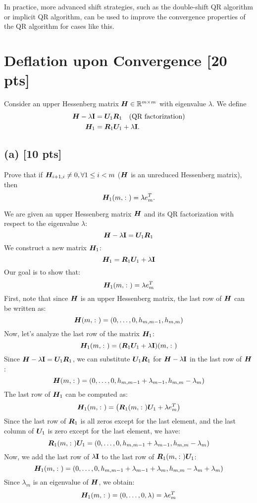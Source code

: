\documentclass[twoside,10pt]{article}
\begin{document}
In practice, more advanced shift strategies, such as the double-shift QR algorithm or implicit QR algorithm, can be used to improve the convergence properties of the QR algorithm for cases like this.

\section{Deflation upon Convergence [20 pts]}
Consider an upper Hessenberg matrix $\bm{H} \in \mathbb{R}^{m \times m}$ with eigenvalue $\lambda$. 
We define 
\begin{align}
  \bm{H} - \lambda \mathbf{I} &= \bm{U}_1 \bm{R}_1 \quad \text{(QR factorization)} \\ 
  \bm{H}_1 &= \bm{R}_1 \bm{U}_1 + \lambda \mathbf{I}.
\end{align}

\subsection*{(a) [10 pts]}
Prove that if $\bm{H}_{i + 1, i} \neq  0, \forall 1 \leq i < m$ ($\bm{H}$ is an unreduced Hessenberg matrix), then 
\begin{equation}
  \mtx{H}_1\left(m, \colon\right) = \lambda e_m^{T}. 
\end{equation}


\quad We are given an upper Hessenberg matrix $\bm{H}$ and its QR factorization with respect to the eigenvalue $\lambda$:
$$\bm{H} - \lambda \mathbf{I} = \bm{U}_1 \bm{R}_1$$
We construct a new matrix $\bm{H}_1$:
$$\bm{H}_1 = \bm{R}_1 \bm{U}_1 + \lambda \mathbf{I}$$
Our goal is to show that:
$$\mtx{H}_1\left(m, \colon\right) = \lambda e_m^{T}$$
First, note that since $\bm{H}$ is an upper Hessenberg matrix, the last row of $\bm{H}$ can be written as:
$$\mtx{H}\left(m, \colon\right) = \left(0, \dots, 0, h_{m,m-1}, h_{m,m}\right)$$
Now, let's analyze the last row of the matrix $\bm{H}_1$:
$$\mtx{H}_1\left(m, \colon\right) = \left(\mtx{R}_1 \mtx{U}_1 + \lambda \Id\right)\left(m, \colon\right)$$
Since $\bm{H} - \lambda \mathbf{I} = \bm{U}_1 \bm{R}_1$, we can substitute $\bm{U}_1 \bm{R}_1$ for $\bm{H} - \lambda \mathbf{I}$ in the last row of $\bm{H}$:
$$\mtx{H}\left(m, \colon\right) = \left(0, \dots, 0, h_{m,m-1} + \lambda_{m-1}, h_{m,m} - \lambda_m\right)$$
The last row of $\bm{H}_1$ can be computed as:
$$\mtx{H}_1\left(m, \colon\right) = \left(\mtx{R}_1\left(m, \colon\right) \mtx{U}_1 + \lambda e_m^{T}\right)$$
Since the last row of $\bm{R}_1$ is all zeros except for the last element, and the last column of $\bm{U}_1$ is zero except for the last element, we have:
$$\mtx{R}_1\left(m, \colon\right) \mtx{U}_1 = \left(0, \dots, 0, h_{m,m-1} + \lambda_{m-1}, h_{m,m} - \lambda_m\right)$$
Now, we add the last row of $\lambda \mathbf{I}$ to the last row of $\mtx{R}_1\left(m, \colon\right) \mtx{U}_1$:
$$\mtx{H}_1\left(m, \colon\right) = \left(0, \dots, 0, h_{m,m-1} + \lambda_{m-1} + \lambda_m, h_{m,m} - \lambda_m + \lambda_m\right)$$
Since $\lambda_m$ is an eigenvalue of $\bm{H}$, we obtain:
$$\mtx{H}_1\left(m, \colon\right) = \left(0, \dots, 0, \lambda\right) = \lambda e_m^{T}$$
\end{document}
